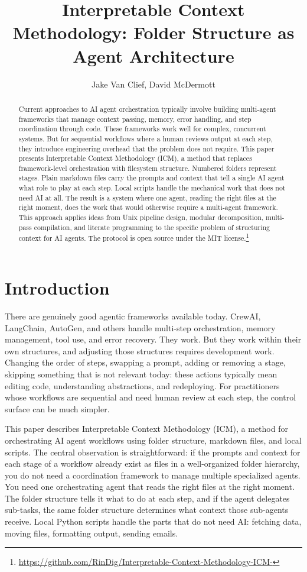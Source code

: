 \documentclass[acmlarge,nonacm,screen]{acmart}
\title{Interpretable Context Methodology: Folder Structure as Agent Architecture}
\author{Jake Van Clief, David McDermott}
\affiliation{%
  \institution{Eduba, University of Edinburgh}
  \city{Palm Coast}
  \state{Florida}
  \country{USA}
}
\begin{document}
\begin{abstract}
Current approaches to AI agent orchestration typically involve building multi-agent frameworks that manage context passing, memory, error handling, and step coordination through code. These frameworks work well for complex, concurrent systems. But for sequential workflows where a human reviews output at each step, they introduce engineering overhead that the problem does not require. This paper presents Interpretable Context Methodology (ICM), a method that replaces framework-level orchestration with filesystem structure. Numbered folders represent stages. Plain markdown files carry the prompts and context that tell a single AI agent what role to play at each step. Local scripts handle the mechanical work that does not need AI at all. The result is a system where one agent, reading the right files at the right moment, does the work that would otherwise require a multi-agent framework. This approach applies ideas from Unix pipeline design, modular decomposition, multi-pass compilation, and literate programming to the specific problem of structuring context for AI agents. The protocol is open source under the MIT license.\footnote{\url{https://github.com/RinDig/Interpretable-Context-Methodology-ICM-}}
\end{abstract}

\maketitle

\section{Introduction}

There are genuinely good agentic frameworks available today. CrewAI, LangChain, AutoGen, and others handle multi-step orchestration, memory management, tool use, and error recovery. They work. But they work within their own structures, and adjusting those structures requires development work. Changing the order of steps, swapping a prompt, adding or removing a stage, skipping something that is not relevant today: these actions typically mean editing code, understanding abstractions, and redeploying. For practitioners whose workflows are sequential and need human review at each step, the control surface can be much simpler.

This paper describes Interpretable Context Methodology (ICM), a method for orchestrating AI agent workflows using folder structure, markdown files, and local scripts. The central observation is straightforward: if the prompts and context for each stage of a workflow already exist as files in a well-organized folder hierarchy, you do not need a coordination framework to manage multiple specialized agents. You need one orchestrating agent that reads the right files at the right moment. The folder structure tells it what to do at each step, and if the agent delegates sub-tasks, the same folder structure determines what context those sub-agents receive. Local Python scripts handle the parts that do not need AI: fetching data, moving files, formatting output, sending emails.
\end{document}

